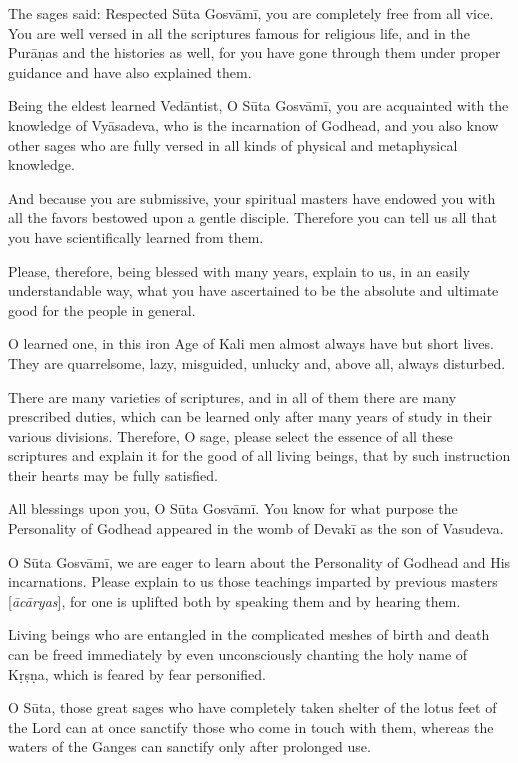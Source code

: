 \documentclass[twoside]{purana}
\begin{document}
The sages said: Respected Sūta Gosvāmī, you are completely free from all vice.
You are well versed in all the scriptures famous for religious life, and in
the Purāṇas and the histories as well, for you have gone through them under
proper guidance and have also explained them.

Being the eldest learned Vedāntist, O Sūta Gosvāmī, you are acquainted with
the knowledge of Vyāsadeva, who is the incarnation of Godhead, and you also know
other sages who are fully versed in all kinds of physical and metaphysical
knowledge.

And because you are submissive, your spiritual masters have endowed you with all
the favors bestowed upon a gentle disciple. Therefore you can tell us all that
you have scientifically learned from them.

Please, therefore, being blessed with many years, explain to us, in an easily
understandable way, what you have ascertained to be the absolute and ultimate
good for the people in general.

O learned one, in this iron Age of Kali men almost always have but short lives.
They are quarrelsome, lazy, misguided, unlucky and, above all, always disturbed.

There are many varieties of scriptures, and in all of them there are many
prescribed duties, which can be learned only after many years of study in their
various divisions. Therefore, O sage, please select the essence of all these
scriptures and explain it for the good of all living beings, that by such
instruction their hearts may be fully satisfied.

All blessings upon you, O Sūta Gosvāmī. You know for what purpose
the Personality of Godhead appeared in the womb of Devakī as the son of Vasudeva.

O Sūta Gosvāmī, we are eager to learn about the Personality of Godhead and His
incarnations. Please explain to us those teachings imparted by previous masters
  [\emph{ācāryas}], for one is uplifted both by speaking them and by hearing them.

Living beings who are entangled in the complicated meshes of birth and death can
be freed immediately by even unconsciously chanting the holy name of Kṛṣṇa,
which is feared by fear personified.

O Sūta, those great sages who have completely taken shelter of the lotus feet of
the Lord can at once sanctify those who come in touch with them, whereas
the waters of the Ganges can sanctify only after prolonged use.
\end{document}
